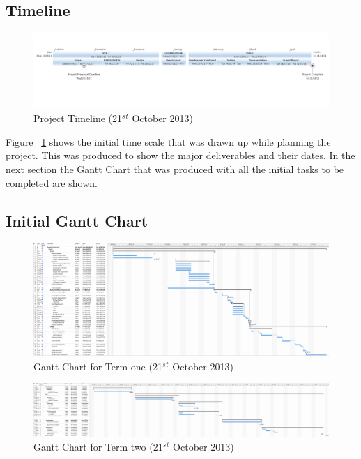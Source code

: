 \begin{landscape}

\subsection{Timeline}

\begin{figure}[H]
  \centering
  \includegraphics[width=\linewidth]{images/timeline1.png}
  \caption{Project Timeline (21$^s$$^t$ October 2013)}
  \label{fig:timeline1}
\end{figure}

Figure ~\ref{fig:timeline1} shows the initial time scale that was drawn up while
planning the project. This was produced to show the major deliverables and their
dates. In the next section the Gantt Chart that was produced with all the
initial tasks to be completed are shown.

\newpage 
\subsection{Initial Gantt Chart}

\begin{figure}[H]
  \centering
  \includegraphics[width=\linewidth]{images/gant_chart1_term1.png}
  \caption{Gantt Chart for Term one (21$^s$$^t$ October 2013)}
  \label{fig:ganttinitialterm1}
\end{figure}

\begin{figure}[H]
  \centering
  \includegraphics[width=\linewidth]{images/gant_chart1_term2.png}
  \caption{Gantt Chart for Term two (21$^s$$^t$ October 2013)}
  \label{fig:ganttinitialterm2}
\end{figure}


\end{landscape}
